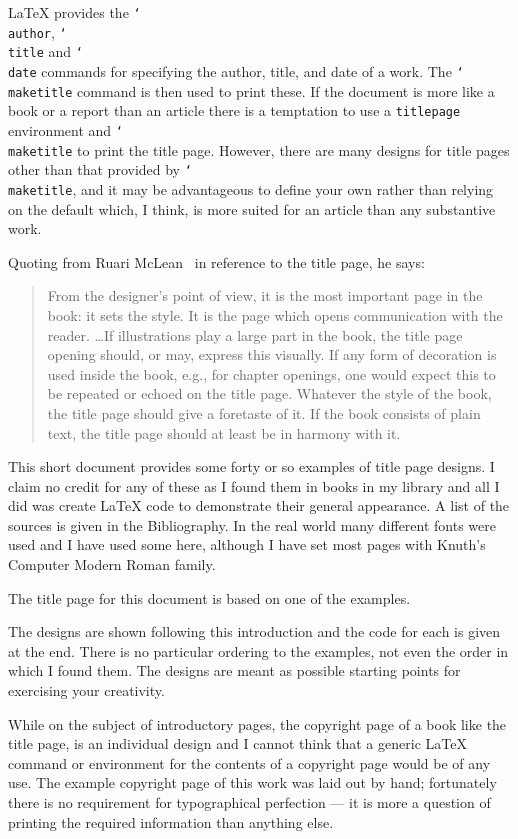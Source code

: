 \documentclass{memoir}
\DeclareRobustCommand{\cs}[1]{\texttt{\char`\\#1}}
\begin{document}
    \LaTeX{} provides the \cs{author}, \cs{title} and \cs{date} commands 
for specifying the author, title, and date of a work. The \cs{maketitle} 
command is then used to print these. If the document is more like a book 
or a report than an article there is a temptation to use a \texttt{titlepage}
environment and \cs{maketitle} to print the title page. However, there are
many designs for title pages other than that provided by \cs{maketitle}, and
it may be advantageous to define your own rather than relying on the default 
which, I think, is more suited for an article than any substantive work.

Quoting from Ruari McLean~\cite{MCLEAN80} in reference to the title page, he says:
\begin{quote}
From the designer's point of view, it is the most important page in the book: 
it sets the style. It is the page which opens communication with the reader.
\ldots If illustrations play a large part in the book, the title page opening
should, or may, express this visually. If any form of decoration is used inside
the book, e.g., for chapter openings, one would expect this to be repeated
or echoed on the title page. Whatever the style of the book, the title page 
should give a foretaste of it. If the book consists of plain text, the title
page should at least be in harmony with it.
\end{quote}

This short document provides some forty or so examples of title page designs. 
I claim no credit for any of these as I found them in books in my 
library and all I did was create \LaTeX{} code to demonstrate their
general appearance. A list of the sources is given in the Bibliography.
In the real world many different fonts were used 
and I have used some here, although I have set most pages with
Knuth's Computer Modern Roman family.

    The title page for this document is based on one of the examples.

   The designs are shown following this introduction and the code for 
each is 
given at the end. There is no particular ordering to the examples, not
even the order in which I found them. The designs are meant as possible 
starting points for exercising your creativity.

    While on the subject of introductory pages, the copyright page of a book 
like the title page, is an individual
design and I cannot think that a generic \LaTeX{} command or environment
for the contents of a copyright page would be of any use. The example
copyright page of this work was laid out by hand; fortunately there is
no requirement for typographical perfection --- it is more a question of
printing the required information than anything else.
\end{document}
